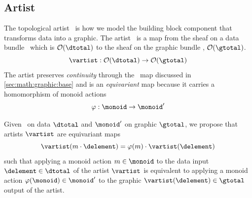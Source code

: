 \documentclass[../main.tex]{subfiles}
\begin{document}
\subsection{Artist}
\label{sec:artist}
The topological artist \vartist\ is how we model the building block component that transforms data into a graphic. The artist \vartist\ is a map from the sheaf on a data bundle \dtotal\ which is $\mathcal{O}(\dtotal)$ to the sheaf on the graphic bundle \gtotal, $\mathcal{O}(\gtotal)$. 
\begin{equation}
    \vartist: \mathcal{O}(\dtotal) \rightarrow \mathcal{O}(\gtotal)
    \label{eq:math:artist:artist}
\end{equation}
The artist preserves \textit{continuity} through the \vindex\ map discussed in \autoref{sec:math:graphic:base} and is an \textit{equivariant} map because it carries a homomorphism of monoid actions \cite{cegarraCohomologyMonoidsOperators2019}
\begin{equation}
    \varphi: \monoid \rightarrow \monoid^{\prime}
\end{equation}

Given \monoid\ on data $\mathscr{\dtotal}$ and $\monoid^{\prime}$ on graphic $\mathscr{\gtotal}$, we propose that artists $\mathscr{\vartist}$ are equivariant maps 
\begin{equation}
\vartist(m\cdot \delement) = \varphi(m)\cdot \vartist(\delement) 
\end{equation}
such that applying a monoid action $m \in \monoid$ to the data input $\delement \in \mathscr{\dtotal}$ of the artist $\mathscr{\vartist}$ is equivalent to applying a monoid action $\varphi(\monoid) \in \monoid^{\prime}$ to the graphic $\vartist(\delement) \in \mathscr{\gtotal}$ output of the artist.
\end{document}
